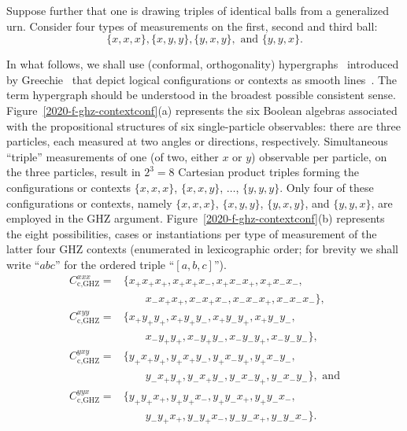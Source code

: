 \documentclass[sn-mathphys]{sn-jnl}%
\theoremstyle{thmstyleone}%
\theoremstyle{thmstyletwo}%
\theoremstyle{thmstylethree}%
\begin{document}
Suppose further that one is drawing triples of identical balls from a generalized urn.
Consider four types of measurements on the first, second and third ball:
\begin{equation}
 \{  {{x}} , {{x}} , {{x}}  \}
,
 \{  {{x}} , {{y}} , {{y}}  \}
,
 \{  {{y}} , {{x}} , {{y}}  \}
, \textrm{ and }
 \{  {{y}} , {{y}} , {{x}}  \}
.
\label{2020-ghz-ghlm}
\end{equation}


In what follows, we shall use (conformal, orthogonality) hypergraphs~\cite[Sect.~2.4]{Bretto-MR3077516} introduced by Greechie~\cite[p.~120]{greechie:71}
that depict
logical configurations or
contexts as smooth lines~\cite{Greechie1968,kalmbach-83,svozil-tkadlec,Mckay2000,Pavicic-2005,Bretto-MR3077516,2018-minimalYIYS}.
The term hypergraph should be understood in the broadest possible consistent sense.
Figure~\ref{2020-f-ghz-contextconf}(a) represents the six Boolean algebras
associated with the propositional structures of six single-particle observables:
there are three particles, each measured at two angles or directions, respectively.
Simultaneous ``triple'' measurements of one (of two, either $x$ or $y$) observable per particle, on the three particles,
result in $2^3=8$ Cartesian product triples
forming the configurations or contexts
$\{x,x,x\}$,
$\{x,x,y\}$,
$\ldots$,
$\{y,y,y\}$.
Only four of these configurations or contexts, namely
$\{x,x,x\}$,
$\{x,y,y\}$,
$\{y,x,y\}$, and
$\{y,y,x\}$,
are employed in the GHZ argument.
Figure~\ref{2020-f-ghz-contextconf}(b) represents the eight possibilities, cases or instantiations per type of measurement
of the latter four GHZ contexts
(enumerated in lexicographic order; for brevity
we shall write ``${{a}}{{b}}{{c}}$''
for the ordered triple ``$\left[ {{a}},{{b}},{{c}} \right]$'').
\begin{equation}
\begin{aligned}
C_\textrm{c,GHZ}^{{{x}}{{x}}{{x}}}=& \{ x_+x_+x_+,x_+x_+x_-,x_+x_-x_+,x_+x_-x_-,\\ &\qquad x_-x_+x_+,x_-x_+x_-,x_-x_-x_+,x_-x_-x_- \}
,    \\
C_\textrm{c,GHZ}^{{{x}}{{y}}{{y}}}=& \{ x_+y_+y_+,x_+y_+y_-,x_+y_-y_+,x_+y_-y_-,\\ &\qquad x_-y_+y_+,x_-y_+y_-,x_-y_-y_+,x_-y_-y_- \}
,        \\
C_\textrm{c,GHZ}^{{{y}}{{x}}{{y}}}=& \{ y_+x_+y_+,y_+x_+y_-,y_+x_-y_+,y_+x_-y_-,\\ &\qquad y_-x_+y_+,y_-x_+y_-,y_-x_-y_+,y_-x_-y_- \}
, \textrm{ and}  \\
C_\textrm{c,GHZ}^{{{y}}{{y}}{{x}}}=& \{ y_+y_+x_+,y_+y_+x_-,y_+y_-x_+,y_+y_-x_-,\\ &\qquad y_-y_+x_+,y_-y_+x_-,y_-y_-x_+,y_-y_-x_- \}
.
\end{aligned}
\label{2020-ghz-ghlmcontexpl}
\end{equation}
\end{document}
